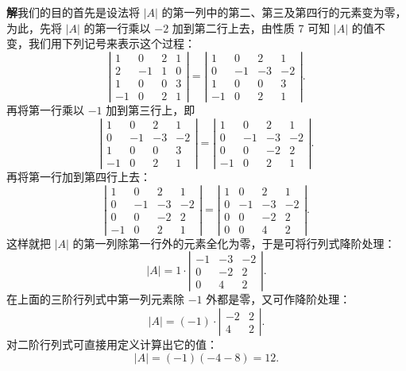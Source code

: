 \documentclass[UTF8,12pt,a4paper,fontset=fandol]{ctexart}
\begin{document}
\noindent\textbf{解}\quad 我们的目的首先是设法将 $|A|$ 的第一列中的第二、第三及第四行的元素变为零，为此，先将 $|A|$ 的第一行乘以 $-2$ 加到第二行上去，由性质 7 可知 $|A|$ 的值不变，我们用下列记号来表示这个过程：
\[
\left|\begin{array}{rrrr}
1 & 0 & 2 & 1\\
2 & -1 & 1 & 0\\
1 & 0 & 0 & 3\\
-1 & 0 & 2 & 1
\end{array}\right|
=
\left|\begin{array}{rrrr}
1 & 0 & 2 & 1\\
0 & -1 & -3 & -2\\
1 & 0 & 0 & 3\\
-1 & 0 & 2 & 1
\end{array}\right|.
\]
再将第一行乘以 $-1$ 加到第三行上，即
\[
\left|\begin{array}{rrrr}
1 & 0 & 2 & 1\\
0 & -1 & -3 & -2\\
1 & 0 & 0 & 3\\
-1 & 0 & 2 & 1
\end{array}\right|
=
\left|\begin{array}{rrrr}
1 & 0 & 2 & 1\\
0 & -1 & -3 & -2\\
0 & 0 & -2 & 2\\
-1 & 0 & 2 & 1
\end{array}\right|.
\]
再将第一行加到第四行上去：
\[
\left|\begin{array}{rrrr}
1 & 0 & 2 & 1\\
0 & -1 & -3 & -2\\
0 & 0 & -2 & 2\\
-1 & 0 & 2 & 1
\end{array}\right|
=
\left|\begin{array}{rrrr}
1 & 0 & 2 & 1\\
0 & -1 & -3 & -2\\
0 & 0 & -2 & 2\\
0 & 0 & 4 & 2
\end{array}\right|.
\]
这样就把 $|A|$ 的第一列除第一行外的元素全化为零，于是可将行列式降阶处理：
\[
|A|=1\cdot
\left|\begin{array}{rrr}
-1 & -3 & -2\\
0 & -2 & 2\\
0 & 4 & 2
\end{array}\right|.
\]
在上面的三阶行列式中第一列元素除 $-1$ 外都是零，又可作降阶处理：
\[
|A|=(-1)\cdot
\left|\begin{array}{rr}
-2 & 2\\
4 & 2
\end{array}\right|.
\]
对二阶行列式可直接用定义计算出它的值：
\[
|A|=(-1)(-4-8)=12.
\]
\end{document}
